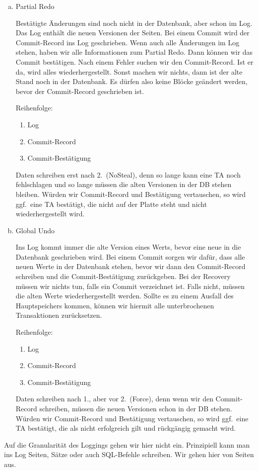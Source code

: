 \begin{solution}
\begin{enumerate}[a)]
\item Partial Redo

Bestätigte Änderungen sind noch nicht in der Datenbank, aber schon im Log. Das Log enthält die neuen Versionen der Seiten. Bei einem Commit wird der Commit-Record ins Log geschrieben. Wenn auch alle Änderungen im Log stehen, haben wir alle Informationen zum Partial Redo. Dann können wir das Commit bestätigen. Nach einem Fehler suchen wir den Commit-Record. Ist er da, wird alles wiederhergestellt. Sonst machen wir nichts, dann ist der alte Stand noch in der Datenbank. Es dürfen also keine Blöcke geändert werden, bevor der Commit-Record geschrieben ist.

Reihenfolge:
\begin{enumerate}[1.]
	\item Log
	\item Commit-Record
	\item Commit-Bestätigung
\end{enumerate}

Daten schreiben erst nach 2.\ (NoSteal), denn so lange kann eine TA noch fehlschlagen und so lange müssen die alten Versionen in der DB stehen bleiben. Würden wir Commit-Record und Bestätigung vertauschen, so wird ggf.\ eine TA bestätigt, die nicht auf der Platte steht und nicht wiederhergestellt wird.

\item Global Undo

Ins Log kommt immer die alte Version eines Werts, bevor eine neue in die Datenbank geschrieben wird. Bei einem Commit sorgen wir dafür, dass alle neuen Werte in der Datenbank stehen, bevor wir dann den Commit-Record schreiben und die Commit-Bestätigung zurückgeben. Bei der Recovery müssen wir nichts tun, falls ein Commit verzeichnet ist. Falls nicht, müssen die alten Werte wiederhergestellt werden.
Sollte es zu einem Ausfall des Hauptspeichers kommen, können wir hiermit alle unterbrochenen Transaktionen zurücksetzen.

Reihenfolge:
\begin{enumerate}[1.]
	\item Log
	\item Commit-Record
	\item Commit-Bestätigung
\end{enumerate}

Daten schreiben nach 1., aber vor 2.\ (Force), denn wenn wir den Commit-Record schreiben, müssen die neuen Versionen schon in der DB stehen. Würden wir Commit-Record und Bestätigung vertauschen, so wird ggf.\ eine TA bestätigt, die als nicht erfolgreich gilt und rückgängig gemacht wird.
\end{enumerate}

\end{solution}

\begin{note}
Auf die Granularität des Loggings gehen wir hier nicht ein. Prinzipiell kann man ins Log Seiten, Sätze oder auch SQL-Befehle schreiben. Wir gehen hier von Seiten aus.
\end{note}

